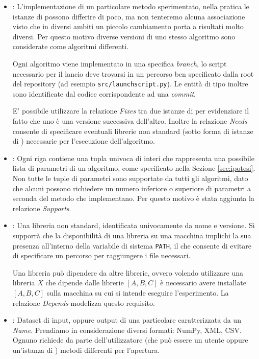 \documentclass{article}
\begin{document}
\begin{itemize}
    \item {}: L'implementazione di un particolare metodo sperimentato, nella pratica le istanze di  possono differire di poco, ma non tenteremo alcuna associazione visto che in diversi ambiti un piccolo cambiamento porta a risultati molto diversi. Per questo motivo diverse versioni di uno stesso algoritmo sono considerate come algoritmi differenti.

    Ogni algoritmo viene implementato in una specifica \emph{branch}, lo script necessario per il lancio deve trovarsi in un percorso ben specificato dalla root del repository (ad esempio \texttt{src/launchscript.py}). Le entità di tipo  inoltre sono identificate dal codice corrispondente ad una \emph{commit}.

    E' possibile utilizzare la relazione \emph{Fixes} tra due istanze di  per evidenziare il fatto che uno è una versione successiva dell'altro. Inoltre la relazione \emph{Needs} consente di specificare eventuali librerie non standard (sotto forma di istanze di ) necessarie per l'esecuzione dell'algoritmo.
    \item {}: Ogni riga contiene una tupla univoca di interi che rappresenta una possibile lista di parametri di un algoritmo, come specificato nella Sezione \ref{sec:ipotesi}. Non tutte le tuple di parametri sono supportate da tutti gli algoritmi, dato che alcuni possono richiedere un numero inferiore o superiore di parametri a seconda del metodo che implementano. Per questo motivo è stata aggiunta la relazione \emph{Supports}.
    \item {}: Una libreria non standard, identificata univocamente da nome e versione. Si supporrà che la disponibilità di una libreria su una macchina implichi la sua presenza all'interno della variabile di sistema \texttt{PATH}, il che consente di evitare di specificare un percorso per raggiungere i file necessari.

    Una libreria può dipendere da altre librerie, ovvero volendo utilizzare una libreria $X$ che dipende dalle librerie $[A,B,C]$ è necessario avere installate $[A,B,C]$ sulla macchina su cui si intende eseguire l'esperimento. La relazione \emph{Depends} modelizza questo requisito.
    \item {}: Dataset di input, oppure output di una particolare  caratterizzata da un \emph{Name}. Prendiamo in considerazione diversi formati: NumPy, XML, CSV. Ognuno richiede da parte dell'utilizzatore (che può essere un utente oppure un'istanza di ) metodi differenti per l'apertura.


\end{itemize}
\end{document}
